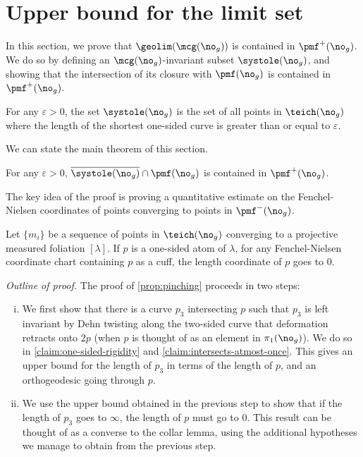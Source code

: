 \documentclass[12pt, reqno]{amsart}
\begin{document}
\section{Upper bound for the limit set}
\label{sec:upper-bound-limit-set}

In this section, we prove that $\geolim(\mcg(\no_g))$ is contained in $\pmf^+(\no_g)$.
We do so by defining an $\mcg(\no_g)$-invariant subset $\systole(\no_g)$, and showing that the intersection of its closure with $\pmf(\no_g)$ is contained in $\pmf^+(\no_g)$.

\begin{definition}
  For any $\varepsilon > 0$, the set $\systole(\no_g)$ is the set of all points in $\teich(\no_g)$ where the length of the shortest one-sided curve is greater than or equal to $\varepsilon$.
\end{definition}

We can state the main theorem of this section.
\begin{theorem}
  \label{thm:systole-closure}
  For any $\varepsilon > 0$, $\overline{\systole(\no_g)} \cap \pmf(\no_g)$ is contained in $\pmf^+(\no_g)$.
\end{theorem}
The key idea of the proof is proving a quantitative estimate on the Fenchel-Nielsen coordinates of points converging to points in $\pmf^-(\no_g)$.
\begin{proposition}
  \label{prop:pinching}
  Let $\{m_i\}$ be a sequence of points in $\teich(\no_g)$ converging to a projective measured foliation $[\lambda]$.
  If $p$ is a one-sided atom of $\lambda$, for any Fenchel-Nielsen coordinate chart containing $p$ as a cuff, the length coordinate of $p$ goes to $0$.
\end{proposition}

\textit{Outline of proof.} The proof of \autoref{prop:pinching} proceeds in two steps:
\begin{enumerate}[(i)]
\item We first show that there is a curve $p_3$ intersecting $p$ such that $p_3$ is left invariant by Dehn twisting along the two-sided curve that deformation retracts onto $2p$ (when $p$ is thought of as an element in $\pi_1(\no_g)$).
  We do so in  \autoref{claim:one-sided-rigidity} and \autoref{claim:intersects-atmost-once}.
  This gives an upper bound for the length of $p_3$ in terms of the length of $p$, and an orthogeodesic going through $p$.
\item We use the upper bound obtained in the previous step to show that if the length of $p_3$ goes to $\infty$, the length of $p$ must go to $0$.
  This result can be thought of as a converse to the collar lemma, using the additional hypotheses we manage to obtain from the previous step.
\end{enumerate}
\end{document}
